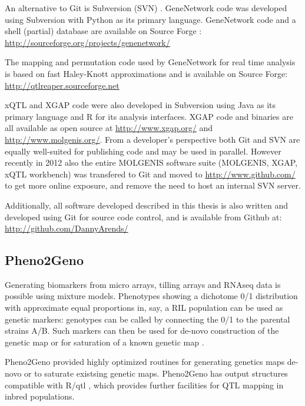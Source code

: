 An alternative to Git is Subversion (SVN) \cite{SVN:2002}. GeneNetwork code was developed 
using Subversion with Python as its primary language. GeneNetwork code and a shell (partial) 
database are available on Source Forge \cite{GeneNetwork:1994, GeneNetwork:2004}:\\
\url{http://sourceforge.org/projects/genenetwork/}

The mapping and permutation code used by GeneNetwork for real time analysis is based on fast 
Haley-Knott approximations \cite{Haley:1992} and is available on Source Forge:\\
\url{http://qtlreaper.sourceforge.net}

xQTL and XGAP code were also developed in Subversion \cite{SVN:2002} using Java as its primary language and 
R for its analysis interfaces. XGAP code and binaries are all available as open source at
\url{http://www.xgap.org/} and \url{http://www.molgenis.org/}. From a developer's perspective both Git and
SVN are equally well-suited for publishing code and may be used in parallel. However recently 
in 2012 also the entire MOLGENIS software suite (MOLGENIS, XGAP, xQTL workbench) was transfered 
to Git and moved to \url{http://www.github.com/} to get more online exposure, and remove the need 
to host an internal SVN server.

Additionally, all software developed described in this thesis is also written and developed 
using Git for source code control, and is available from Github at:\\
\url{http://github.com/DannyArends/}

\subsection{Pheno2Geno}
Generating biomarkers from micro arrays, tilling arrays and RNAseq data is possible using 
mixture models. Phenotypes showing a dichotome 0/1 distribution with approximate equal 
proportions in, say, a RIL population can be used as genetic markers: genotypes can be 
called by connecting the 0/1 to the parental strains A/B. Such markers can then be used 
for de-novo construction of the genetic map or for saturation of a known genetic map 
\cite{West:2006, Truco:2013}.

Pheno2Geno provided highly optimized routines for generating genetics maps de-novo or to 
saturate existsing genetic maps. Pheno2Geno has output structures compatible with R/qtl 
\cite{Broman:2003, Arends:2010}, which provides further facilities for QTL mapping in 
inbred populations.

